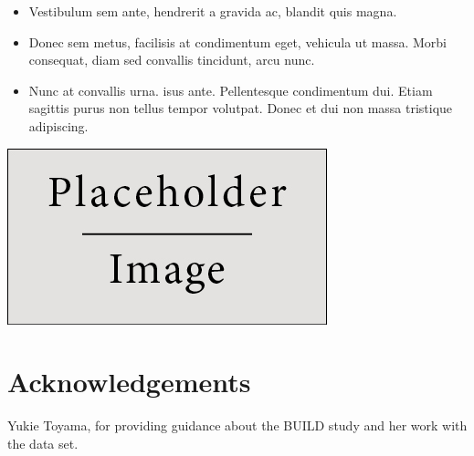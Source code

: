 \documentclass[a0,landscape]{a0poster}
\begin{document}
\begin{multicols}{3}
\begin{itemize}
\item Vestibulum sem ante, hendrerit a gravida ac, blandit quis magna.
\item Donec sem metus, facilisis at condimentum eget, vehicula ut massa. Morbi consequat, diam sed convallis tincidunt, arcu nunc.
\item Nunc at convallis urna. isus ante. Pellentesque condimentum dui. Etiam sagittis purus non tellus tempor volutpat. Donec et dui non massa tristique adipiscing.
\end{itemize}

\color{DarkSlateGray} %

\begin{center}\vspace{1cm}
\includegraphics[width=0.8\linewidth]{placeholder}
\end{center}\vspace{1cm}


\section*{Acknowledgements}

Yukie Toyama, for providing guidance about the BUILD study and her work with the data set.


\end{multicols}
\end{document}
